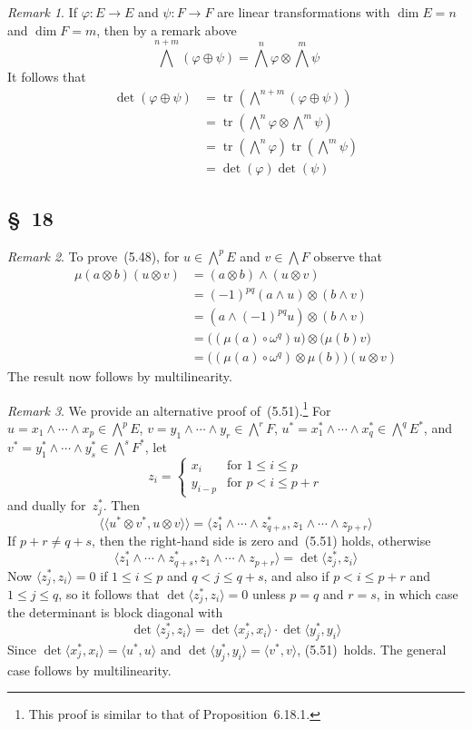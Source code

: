\documentclass[letterpaper,12pt]{article}
\DeclareMathOperator{\tr}{tr}
\newcommand{\after}{\circ}
\newcommand{\dsum}{\oplus}
\newcommand{\mult}{\cdot}
\newcommand{\tprod}{\otimes}
\newcommand{\eprod}{\wedge}
\newcommand{\bigeprod}{\bigwedge}
\newcommand{\medeprod}{{\textstyle\bigeprod}}
\newcommand{\sprod}[2]{\langle#1,#2\rangle}
\newcommand{\ssprod}[2]{\langle\!\langle#1,#2\rangle\!\rangle}
\newcommand{\multi}[4]{#2_{#3}#1\cdots#1#2_{#4}}
\newcommand{\eprods}[3]{\multi{\eprod}{#1}{#2}{#3}}
\theoremstyle{definition}
\theoremstyle{remark}
\newtheorem*{rmk}{Remark}
\begin{document}
\begin{rmk}
If \(\varphi:E\to E\) and \(\psi:F\to F\) are linear transformations with \(\dim E=n\) and \(\dim F=m\), then by a remark above
\[\medeprod^{n+m}(\varphi\dsum\psi)=\medeprod^n\varphi\tprod\medeprod^m\psi\]
It follows that
\begin{align*}
\det(\varphi\dsum\psi)&=\tr(\medeprod^{n+m}(\varphi\dsum\psi))\\
	&=\tr(\medeprod^n\varphi\tprod\medeprod^m\psi)\\
	&=\tr(\medeprod^n\varphi)\tr(\medeprod^m\psi)\\
	&=\det(\varphi)\det(\psi)
\end{align*}
\end{rmk}

\subsection*{\S~18}
\begin{rmk}
To prove~(5.48), for \(u\in\medeprod^p E\) and \(v\in\medeprod F\) observe that
\begin{align*}
\mu(a\tprod b)(u\tprod v)&=(a\tprod b)\eprod(u\tprod v)\\
	&=(-1)^{pq}(a\eprod u)\tprod(b\eprod v)\\
	&=(a\eprod(-1)^{pq}u)\tprod(b\eprod v)\\
	&=\bigl((\mu(a)\after\omega^q)u\bigr)\tprod\bigl(\mu(b)v\bigr)\\
	&=\bigl((\mu(a)\after\omega^q)\tprod\mu(b)\bigr)(u\tprod v)
\end{align*}
The result now follows by multilinearity.
\end{rmk}

\begin{rmk}
We provide an alternative proof of~(5.51).\footnote{This proof is similar to that of Proposition~6.18.1.} For \(u=\eprods{x}{1}{p}\in\medeprod^p E\), \(v=\eprods{y}{1}{r}\in\medeprod^r F\), \(u^*=\eprods{x^*}{1}{q}\in\medeprod^q E^*\), and \(v^*=\eprods{y^*}{1}{s}\in\medeprod^s F^*\), let
\[z_i=\begin{cases}
x_i&\text{for }1\le i\le p\\
y_{i-p}&\text{for }p<i\le p+r
\end{cases}\]
and dually for~\(z^*_j\). Then
\[\ssprod{u^*\tprod v^*}{u\tprod v}=\sprod{\eprods{z^*}{1}{q+s}}{\eprods{z}{1}{p+r}}\]
If \(p+r\ne q+s\), then the right-hand side is zero and~(5.51) holds, otherwise
\[\sprod{\eprods{z^*}{1}{q+s}}{\eprods{z}{1}{p+r}}=\det\sprod{z^*_j}{z_i}\]
Now \(\sprod{z^*_j}{z_i}=0\) if \(1\le i\le p\) and \(q<j\le q+s\), and also if \(p<i\le p+r\) and \(1\le j\le q\), so it follows that \(\det\sprod{z^*_j}{z_i}=0\) unless \(p=q\) and \(r=s\), in which case the determinant is block diagonal with
\[\det\sprod{z^*_j}{z_i}=\det\sprod{x^*_j}{x_i}\mult\det\sprod{y^*_j}{y_i}\]
Since \(\det\sprod{x^*_j}{x_i}=\sprod{u^*}{u}\) and \(\det\sprod{y^*_j}{y_i}=\sprod{v^*}{v}\), (5.51)~holds. The general case follows by multilinearity.
\end{rmk}
\end{document}
